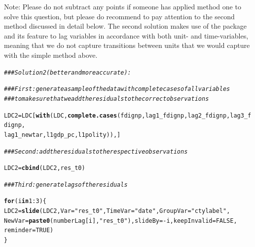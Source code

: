 \documentclass[12pt]{article}\usepackage[]{graphicx}\usepackage[]{color}
\makeatletter
\newcommand{\hlnum}[1]{\textcolor[rgb]{0.686,0.059,0.569}{#1}}%
\newcommand{\hlstr}[1]{\textcolor[rgb]{0.192,0.494,0.8}{#1}}%
\newcommand{\hlcom}[1]{\textcolor[rgb]{0.678,0.584,0.686}{\textit{#1}}}%
\newcommand{\hlopt}[1]{\textcolor[rgb]{0,0,0}{#1}}%
\newcommand{\hlstd}[1]{\textcolor[rgb]{0.345,0.345,0.345}{#1}}%
\newcommand{\hlkwa}[1]{\textcolor[rgb]{0.161,0.373,0.58}{\textbf{#1}}}%
\newcommand{\hlkwb}[1]{\textcolor[rgb]{0.69,0.353,0.396}{#1}}%
\newcommand{\hlkwc}[1]{\textcolor[rgb]{0.333,0.667,0.333}{#1}}%
\newcommand{\hlkwd}[1]{\textcolor[rgb]{0.737,0.353,0.396}{\textbf{#1}}}%
\newenvironment{kframe}{%
 \def\at@end@of@kframe{}%
 \ifinner\ifhmode%
  \def\at@end@of@kframe{\end{minipage}}%
  \begin{minipage}{\columnwidth}%
 \fi\fi%
 \def\FrameCommand##1{\hskip\@totalleftmargin \hskip-\fboxsep
 \colorbox{shadecolor}{##1}\hskip-\fboxsep
     \hskip-\linewidth \hskip-\@totalleftmargin \hskip\columnwidth}%
 \MakeFramed {\advance\hsize-\width
   \@totalleftmargin\z@ \linewidth\hsize
   \@setminipage}}%
 {\par\unskip\endMakeFramed%
 \at@end@of@kframe}
\newenvironment{knitrout}{}{} %
\makeatother
\begin{document}
Note: Please do not subtract any points if someone has applied method one to solve this question, but please do recommend to pay attention to the second method discussed in detail below. The second solution makes use of the  package and its feature to lag variables in accordance with both unit- and time-variables, meaning that we do not capture transitions between units that we would capture with the simple method above.

\begin{knitrout}
\color{fgcolor}\begin{kframe}
\begin{alltt}
\hlcom{### Solution 2 (better and more accurate):}

\hlcom{### First: generate a sample of the data with complete cases of all variables}
\hlcom{### to make sure that we add the residuals to the correct observations}

\hlstd{LDC2} \hlkwb{=} \hlstd{LDC[}\hlkwd{with}\hlstd{(LDC,} \hlkwd{complete.cases}\hlstd{(fdignp, lag1_fdignp, lag2_fdignp, lag3_fdignp,}
    \hlstd{lag1_newtar, l1gdp_pc, l1polity)), ]}

\hlcom{### Second: add the residuals to the respective observations}

\hlstd{LDC2} \hlkwb{=} \hlkwd{cbind}\hlstd{(LDC2, res_t0)}

\hlcom{### Third: generate lags of the residuals}

\hlkwa{for} \hlstd{(i} \hlkwa{in} \hlnum{1}\hlopt{:}\hlnum{3}\hlstd{) \{}
    \hlstd{LDC2} \hlkwb{=} \hlkwd{slide}\hlstd{(LDC2,} \hlkwc{Var} \hlstd{=} \hlstr{"res_t0"}\hlstd{,} \hlkwc{TimeVar} \hlstd{=} \hlstr{"date"}\hlstd{,} \hlkwc{GroupVar} \hlstd{=} \hlstr{"ctylabel"}\hlstd{,}
        \hlkwc{NewVar} \hlstd{=} \hlkwd{paste0}\hlstd{(numberLag[i],} \hlstr{"res_t0"}\hlstd{),} \hlkwc{slideBy} \hlstd{=} \hlopt{-}\hlstd{i,} \hlkwc{keepInvalid} \hlstd{=} \hlnum{FALSE}\hlstd{,}
        \hlkwc{reminder} \hlstd{=} \hlnum{TRUE}\hlstd{)}
\hlstd{\}}
\end{alltt}



\end{kframe}
\end{knitrout}
\end{document}
